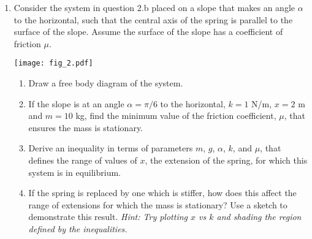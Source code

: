 {\begin{enumerate}
\item Consider the system in question 2.b placed on a slope that makes an angle $\alpha$ to the horizontal, such that the central axis of the spring is parallel to the surface of the slope. Assume the surface of the slope has a coefficient of friction $\mu$.
            \begin{center}
                \texttt{[image: fig\_2.pdf]}
            \end{center}
	\begin{enumerate}
		\item Draw a free body diagram of the system.
		\item If the slope is at an angle $\alpha = \pi/6$ to the horizontal, $k = 1$ N/m, $x = 2$ m and $m = 10$ kg, find the minimum value of the friction coefficient, $\mu$, that 				ensures the mass is 	stationary. 
		\item Derive an inequality in terms of parameters $m$, $g$, $\alpha$, $k$, and $\mu$,  that defines the range of values of $x$, the extension of the spring, for 					which this system is in equilibrium.
		\item If the spring is replaced by one which is stiffer, how does this affect the range of extensions for which the mass is stationary? Use a sketch to demonstrate this result. {\it 			Hint: Try plotting $x$ vs $k$ and shading the region defined by the inequalities.}
	\end{enumerate}
\end{enumerate}
}

